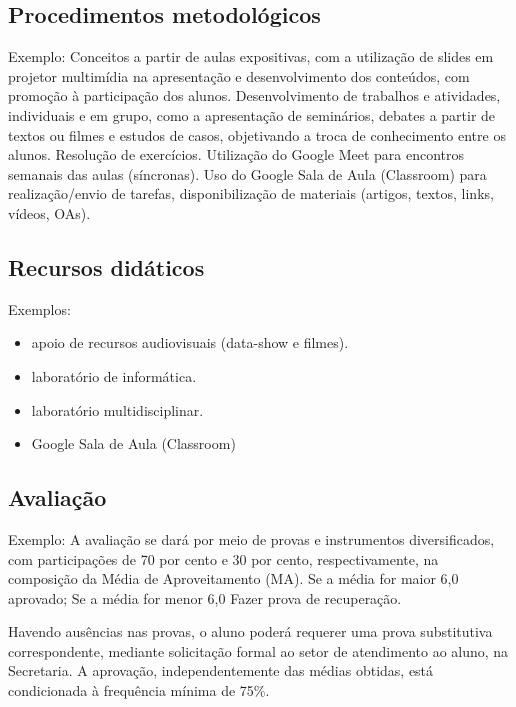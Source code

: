   \begin{snugshade}
  \section{Procedimentos metodológicos} %
  \end{snugshade}

Exemplo: Conceitos a partir de aulas expositivas, com a utilização de slides em projetor multimídia na apresentação e desenvolvimento dos conteúdos, com promoção à participação dos alunos. Desenvolvimento de trabalhos e atividades, individuais e em grupo, como a apresentação de seminários, debates a partir de textos ou filmes e estudos de casos, objetivando a troca de conhecimento entre os alunos. Resolução de exercícios. Utilização do Google Meet para encontros semanais das aulas (síncronas). Uso do Google Sala de Aula (Classroom) para realização/envio de tarefas, disponibilização de materiais (artigos, textos, links, vídeos, OAs).

  \begin{snugshade}
  \section{Recursos didáticos} %
  \end{snugshade}
  Exemplos:
    \begin{itemize}
	  \item apoio de recursos audiovisuais (data-show e filmes).
	  \item laboratório de informática.
	  \item laboratório multidisciplinar.
	  \item Google Sala de Aula (Classroom)
    \end{itemize}

  \begin{snugshade}
  \section{Avaliação} %
  \end{snugshade}
  Exemplo: A avaliação se dará por meio de provas e instrumentos diversificados, com participações de 70 por cento e 30 por cento, respectivamente, na composição da Média de Aproveitamento (MA). Se a média for maior 6,0 aprovado; Se a média for menor 6,0 Fazer prova de recuperação.

Havendo ausências nas provas, o aluno poderá requerer uma prova substitutiva correspondente, mediante solicitação formal ao setor de atendimento ao aluno, na Secretaria. A aprovação, independentemente das médias obtidas, está condicionada à frequência mínima de 75\%.